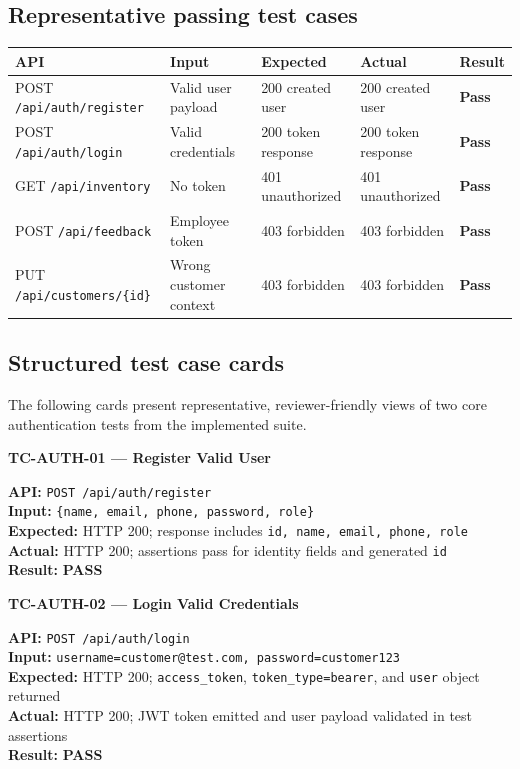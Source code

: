 \documentclass[11pt,a4paper]{article}
\newcommand{\ok}{\textcolor{okgreen}{\textbf{Pass}}}
\newcommand{\apipath}[1]{\texttt{#1}}
\newcommand{\passmark}{\textcolor{okgreen}{\textbf{PASS}}}
\begin{document}
\subsection{Representative passing test cases}
\begin{longtable}{p{}p{}p{}p{}p{}}
\toprule
\textbf{API} & \textbf{Input} & \textbf{Expected} & \textbf{Actual} & \textbf{Result} \\
\midrule
POST \apipath{/api/auth/register} & Valid user payload & 200 created user & 200 created user & \ok \\
POST \apipath{/api/auth/login} & Valid credentials & 200 token response & 200 token response & \ok \\
GET \apipath{/api/inventory} & No token & 401 unauthorized & 401 unauthorized & \ok \\
POST \apipath{/api/feedback} & Employee token & 403 forbidden & 403 forbidden & \ok \\
PUT \apipath{/api/customers/\{id\}} & Wrong customer context & 403 forbidden & 403 forbidden & \ok \\
\bottomrule
\end{longtable}

\subsection{Structured test case cards}
The following cards present representative, reviewer-friendly views of two core authentication tests from the implemented suite.

\textbf{TC-AUTH-01 --- Register Valid User}

\begin{tcolorbox}[colback=green!10,colframe=okgreen,boxrule=0.8pt,arc=2mm]
\textbf{API:} \apipath{POST /api/auth/register} \\
\textbf{Input:} \apipath{\{name, email, phone, password, role\}} \\
\textbf{Expected:} HTTP 200; response includes \apipath{id, name, email, phone, role} \\
\textbf{Actual:} HTTP 200; assertions pass for identity fields and generated \apipath{id} \\
\textbf{Result:} \passmark
\end{tcolorbox}

\textbf{TC-AUTH-02 --- Login Valid Credentials}

\begin{tcolorbox}[colback=green!10,colframe=okgreen,boxrule=0.8pt,arc=2mm]
\textbf{API:} \apipath{POST /api/auth/login} \\
\textbf{Input:} \apipath{username=customer@test.com, password=customer123} \\
\textbf{Expected:} HTTP 200; \apipath{access_token}, \apipath{token_type=bearer}, and \apipath{user} object returned \\
\textbf{Actual:} HTTP 200; JWT token emitted and user payload validated in test assertions \\
\textbf{Result:} \passmark
\end{tcolorbox}
\end{document}
